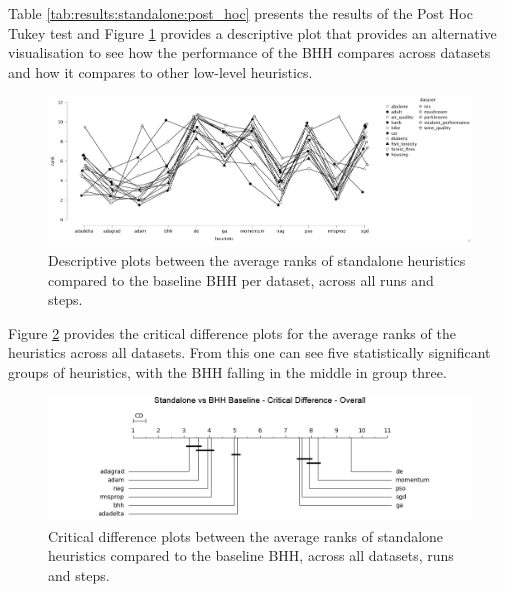 Table \ref{tab:results:standalone:post_hoc} presents the results of the Post Hoc Tukey test and Figure \ref{fig:results:standalone:descriptive:descriptive} provides a descriptive plot that provides an alternative visualisation to see how the performance of the \Ac{BHH} compares across datasets and how it compares to other low-level heuristics.

\begin{figure}[htbp]
	\centering
	\includegraphics[width=\textwidth]{analysis/standalone/figures/descriptive/descriptive.png}
	\caption{Descriptive plots between the average ranks of standalone heuristics compared to the baseline \Acs{BHH} per dataset, across all runs and steps.}
	\label{fig:results:standalone:descriptive:descriptive}
\end{figure}

Figure \ref{fig:results:standalone:descriptive:cd} provides the critical difference plots for the average ranks of the heuristics across all datasets. From this one can see five statistically significant groups of heuristics, with the \Ac{BHH} falling in the middle in group three.


\begin{figure}[htbp]
	\centering
	\includegraphics[width=\textwidth]{analysis/standalone/figures/cd/overall.png}
	\caption{Critical difference plots between the average ranks of standalone heuristics compared to the baseline \Acs{BHH}, across all datasets, runs and steps.}
	\label{fig:results:standalone:descriptive:cd}
\end{figure}

